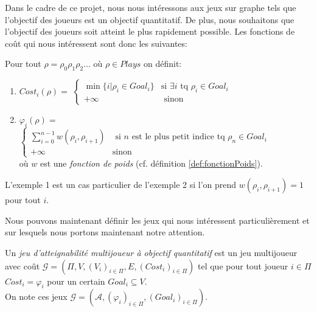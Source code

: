 \setlength{\overfullrule}{0pt}
  Dans le cadre de ce projet, nous nous intéressons aux jeux sur graphe tels que l'objectif des joueurs est un objectif quantitatif. De plus, nous souhaitons que l'objectif des joueurs soit atteint le plus rapidement possible. Les fonctions de coût qui nous intéressent sont donc les suivantes: \\
\begin{exemple}
		\label{ex:fonctionsCout}
	Pour tout  $\rho = \rho _{0} \rho _{1} \rho _{2} \ldots $ où $\rho \in Plays$ on définit:
	\begin{enumerate}
	\item $Cost_{i}(\rho) = $ $\begin{cases} 
									\min \{ i | \rho _{i} \in Goal_{i} \} & \text{si } \exists i \text{ tq } \rho _{i} \in Goal_{i} \\
									
									+\infty & \text{ sinon}
									\end{cases}$
	\item $\varphi _{i}(\rho) = $ $\begin{cases}
									\sum_{i = 0}^{n-1} w(\rho_{i},\rho_{i+1}) & \text{ si } n \text{ est le plus petit indice tq } \rho_{n}\in Goal_{i}\\
									+\infty & \text{sinon}
									\end{cases}$ \\
									où $w$ est une \textit{fonction de poids} (cf. définition \ref{def:fonctionPoids}).
	\end{enumerate}
\end{exemple}
\setlength{\overfullrule}{10pt}
\begin{rem}
	L'exemple 1 est un cas particulier de l'exemple 2 si l'on prend $w(\rho_{i},\rho_{i+1}) = 1$ pour tout $i$.
\end{rem}


Nous pouvons maintenant définir les jeux qui nous intéressent particulièrement et sur lesquels nous portons maintenant notre attention.

\begin{defi}
	
	Un \textit{jeu d'atteignabilité multijoueur à objectif quantitatif} est un jeu multijoueur avec coût $\mathcal{G} = (\Pi ,V ,(V_{i})_{i \in \Pi} ,E ,(Cost_{i})_{i \in \Pi})$ tel que pour tout joueur $i \in \Pi$ $Cost_{i} = \varphi _{i}$ pour un certain $Goal _{i} \subseteq V$.\\
	On note ces jeux $\mathcal{G} = (\mathcal{A},(\varphi _{i})_{i\in \Pi},(Goal_{i})_{i \in \Pi})$.
\end{defi}
	



